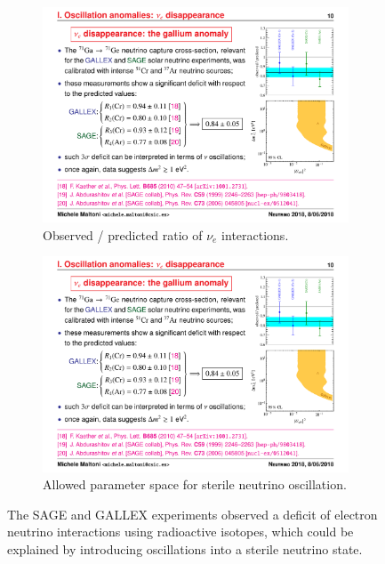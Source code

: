 \begin{figure}[htbp]
  \begin{subfigure}{0.48\textwidth}
    \begin{center}
    \includegraphics[width=\linewidth]{figures/radiochemical_ratio.pdf}
    \caption{Observed / predicted ratio of $\nu_e$ interactions.}
    \end{center}
  \end{subfigure}\hfill
  \begin{subfigure}{0.48\textwidth}
    \begin{center}
    \includegraphics[width=\linewidth]{figures/radiochemical_space.pdf}
    \caption{Allowed parameter space for sterile neutrino oscillation.}
    \end{center}
  \end{subfigure}
  \caption{The SAGE and GALLEX experiments observed a deficit of electron neutrino interactions using radioactive isotopes, which could be explained by introducing oscillations into a sterile neutrino state.}\label{fig:radiochemical}
\end{figure}

